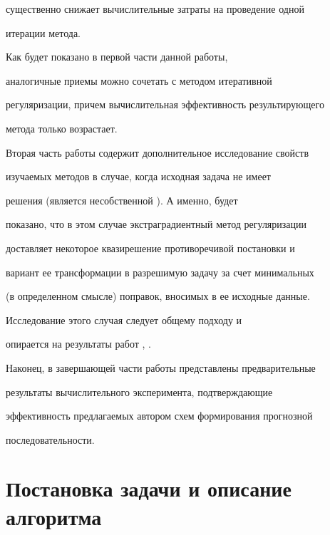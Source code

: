 существенно снижает вычислительные затраты на проведение одной


итерации метода. 





Как будет показано в первой части данной работы,


аналогичные приемы можно сочетать с методом итеративной


регуляризации, причем вычислительная эффективность результирующего


метода только возрастает.





Вторая часть работы содержит дополнительное исследование свойств


изучаемых методов в случае, когда исходная задача не имеет


решения (является несобственной \cite{erem}). А именно, будет


показано, что в этом случае экстраградиентный метод регуляризации


доставляет некоторое квазирешение противоречивой постановки и


вариант ее трансформации в разрешимую задачу за счет минимальных


(в определенном смысле) поправок, вносимых в ее исходные данные.


Исследование этого случая следует общему подходу \cite{erem} и


опирается на результаты работ \cite{kokur}, \cite{ppf3}.





Наконец, в завершающей части работы представлены предварительные


результаты вычислительного эксперимента, подтверждающие


эффективность предлагаемых автором схем формирования прогнозной


последовательности. \vspace{1ex}








\section{Постановка задачи и описание алгоритма}





